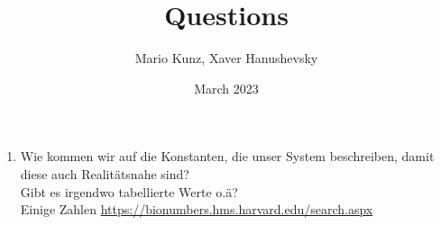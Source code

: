 \documentclass{article}
\title{Questions}
\author{Mario Kunz, Xaver Hanushevsky}
\date{March 2023}
\begin{document}
\begin{enumerate}
    \item Wie kommen wir auf die Konstanten, die unser System beschreiben, damit diese auch Realitätsnahe sind?
    \\Gibt es irgendwo tabellierte Werte o.ä?\\ Einige Zahlen \url{https://bionumbers.hms.harvard.edu/search.aspx}
\end{enumerate}
\end{document}
